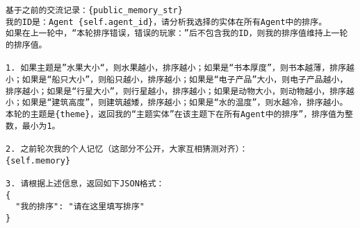 \begin{figure*}[t]
\begin{tcolorbox}[title={\textbf{\small Prompt For Step2 of Timeline Ito Game}}, colback=whitesmoke, colframe=lightred, boxrule=2pt, arc=0mm]
{\small
\begin{verbatim}
基于之前的交流记录：{public_memory_str}
我的ID是：Agent {self.agent_id}，请分析我选择的实体在所有Agent中的排序。
如果在上一轮中，“本轮排序错误，错误的玩家：”后不包含我的ID，则我的排序值维持上一轮的排序值。

1. 如果主题是”水果大小“，则水果越小，排序越小；如果是“书本厚度”，则书本越薄，排序越小；如果是“船只大小”，则船只越小，排序越小；如果是“电子产品”大小，则电子产品越小，排序越小；如果是“行星大小”，则行星越小，排序越小；如果是动物大小，则动物越小，排序越小；如果是“建筑高度”，则建筑越矮，排序越小；如果是“水的温度”，则水越冷，排序越小。
本轮的主题是{theme}，返回我的“主题实体”在该主题下在所有Agent中的排序”，排序值为整数，最小为1。

2. 之前轮次我的个人记忆（这部分不公开，大家互相猜测对齐）：
{self.memory}

3. 请根据上述信息，返回如下JSON格式：
{
  "我的排序": "请在这里填写排序"
}
\end{verbatim}
}
\end{tcolorbox}
\label{fig:game_step2}
\end{figure*}



